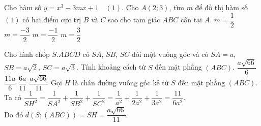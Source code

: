 \begin{ex}%
Cho hàm số $y=x^3-3mx+1 \quad(1)$. Cho $A(2;3)$, tìm $m$ để đồ thị hàm số $(1)$ có hai điểm cực trị $B$ và $C$ sao cho tam giác $ABC$ cân tại $A$.
\choice
{\True $m=\dfrac{1}{2}$}
{$m=\dfrac{-3}{2}$}
{$m=\dfrac{-1}{2}$}
{$m=\dfrac{3}{2}$}
\end{ex}

\begin{ex}%
Cho hình chóp $S.ABCD$ có $SA$, $SB$, $SC$ đôi một vuông góc và có $SA=a$, $SB=a\sqrt{2}$, $SC=a\sqrt{3}$. Tính khoảng cách từ $S$ đến mặt phẳng $(ABC)$.
\choice
{$\dfrac{a\sqrt{66}}{6}$}
{$\dfrac{11a}{6}$}
{$\dfrac{6a}{11}$}
{\True $\dfrac{a\sqrt{66}}{11}$}
\loigiai
{
Gọi $H$ là chân đường vuông góc kẻ từ $S$ đến mặt phẳng $(ABC)$. \\
Ta có $\dfrac{1}{SH^2}=\dfrac{1}{SA^2}+\dfrac{1}{SB^2}+\dfrac{1}{SC^2}=\dfrac{1}{a^2}+\dfrac{1}{2a^2}+\dfrac{1}{3a^2}=\dfrac{11}{6a^2}$.\\
Do đó $d \left( S;(ABC) \right)=SH=\dfrac{a\sqrt{66}}{11}$. 
}
\end{ex}

